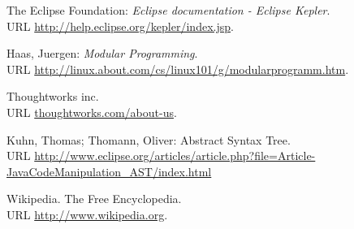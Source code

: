 \documentclass[11pt,a4paper,oneside, 
liststotoc, 					%
bibtotoc,						%
titlepage, 						%
headsepline, 					%
BCOR6mm,						%
english
]{scrreprt}
\begin{document}
\begin{thebibliography}{999999}
 The Eclipse Foundation: 
\emph{Eclipse documentation - Eclipse Kepler}. \\ URL \url{http://help.eclipse.org/kepler/index.jsp}.

 Haas, Juergen: \emph{Modular Programming}.\\ URL \url{http://linux.about.com/cs/linux101/g/modularprogramm.htm}.

 Thoughtworks inc. \\ URL \url{thoughtworks.com/about-us}.

 Kuhn, Thomas; Thomann, Oliver: Abstract Syntax Tree. \\ URL \url{http://www.eclipse.org/articles/article.php?file=Article-JavaCodeManipulation_AST/index.html}

 Wikipedia. The Free Encyclopedia. \\ URL \url{http://www.wikipedia.org}.

\end{thebibliography}


\begin{appendix}
\clearpage
{}						%
\end{appendix}
\end{document}
